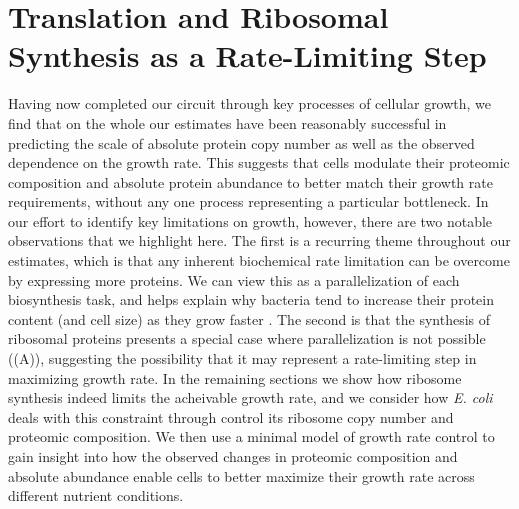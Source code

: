 \section{Translation and Ribosomal Synthesis as a Rate-Limiting Step}
Having now completed our circuit through key processes of cellular growth,
we find that on the whole our estimates have been reasonably successful in predicting
the scale of absolute protein copy number as well as the observed dependence on
the growth rate. This suggests that cells modulate their proteomic
composition and absolute protein abundance to better match their growth rate
requirements, without any one process representing a particular bottleneck. In
our effort to identify key limitations on growth, however, there are two notable
observations that we highlight here. The first is a recurring theme throughout
our estimates, which is that any inherent biochemical rate limitation can be
overcome by expressing more proteins. We can view this as a parallelization of
each biosynthesis task, and helps explain why bacteria
tend to increase their protein content (and cell size) as they grow faster
\citep{ojkic2019}. The second is that the synthesis of ribosomal proteins presents a
special case where parallelization is not possible ((A)),
suggesting the possibility that it may represent a rate-limiting step in
maximizing growth rate. In the remaining sections we show how ribosome synthesis
indeed limits the acheivable growth rate, and we consider how \textit{E. coli}
deals with this constraint through control its ribosome copy number and
proteomic composition.  We then use a minimal model of growth rate control to
gain insight into how the observed changes in proteomic composition and absolute
abundance enable cells to better maximize their growth rate across different
nutrient conditions.


